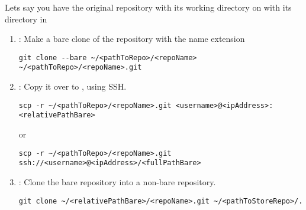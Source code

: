 
Lets say you have the original repository with its working directory on  with its  directory in 

\begin{enumerate}
    \item {}: Make a bare clone of the repository with the name extension 
    \begin{verbatim}
git clone --bare ~/<pathToRepo>/<repoName> ~/<pathToRepo>/<repoName>.git
    \end{verbatim}
    
    \item {}: Copy it over to , using SSH.
    \begin{verbatim}
scp -r ~/<pathToRepo>/<repoName>.git <username>@<ipAddress>:<relativePathBare>
    \end{verbatim}
    or
    \begin{verbatim}
scp -r ~/<pathToRepo>/<repoName>.git ssh://<username>@<ipAddress>/<fullPathBare>
    \end{verbatim}

    \item {}: Clone the bare repository into a non-bare repository.
    \begin{verbatim}
git clone ~/<relativePathBare>/<repoName>.git ~/<pathToStoreRepo>/.
    \end{verbatim}
\end{enumerate}
